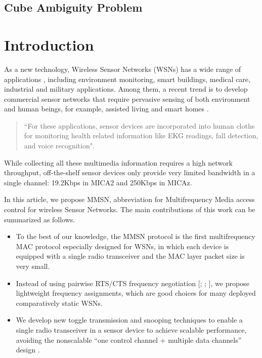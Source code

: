 \documentclass[acmcmpt, twoside]{acmsmall}
\begin{document}
\subsection{Cube Ambiguity Problem}



\cite{Lorensen-87}



\newpage
\newpage
\section{Introduction}

As a new technology, Wireless Sensor Networks (WSNs) has a wide
range of applications \cite{Culler-01,Bahl-02,Akyildiz-01}, including
environment monitoring, smart buildings, medical care, industrial and
military applications. Among them, a recent trend is to develop
commercial sensor networks that require pervasive sensing of both
environment and human beings, for example, assisted living
\cite{Akyildiz-02,Harvard-01,CROSSBOW} and smart homes
\cite{Harvard-01,Adya-01,CROSSBOW}.
\begin{quote}
``For these applications, sensor devices are incorporated into human
cloths \cite{Natarajan-01,Zhou-06,Bahl-02,Adya-01} for monitoring
health related information like EKG readings, fall detection, and voice recognition".
\end{quote}
While collecting all these multimedia information
\cite{Akyildiz-02} requires a high network throughput, off-the-shelf
sensor devices only provide very limited bandwidth in a single
channel: 19.2Kbps in MICA2 \cite{Bahl-02} and 250Kbps in MICAz.

In this article, we propose MMSN, abbreviation for Multifrequency
Media access control for wireless Sensor Networks. The main
contributions of this work can be summarized as follows.
\begin{itemize}
\item To the best of our knowledge, the MMSN protocol is the first
multifrequency MAC protocol especially designed for WSNs, in which
each device is equipped with a single radio transceiver and
the MAC layer packet size is very small.
\item Instead of using pairwise RTS/CTS frequency negotiation
[; ; ],
we propose lightweight frequency assignments, which are good choices
for many deployed comparatively static WSNs.
\item We develop new toggle transmission and snooping techniques to
enable a single radio transceiver in a sensor device to achieve
scalable performance, avoiding the nonscalable ``one
control channel + multiple data channels'' design \cite{Natarajan-01}.
\end{itemize}
\end{document}
